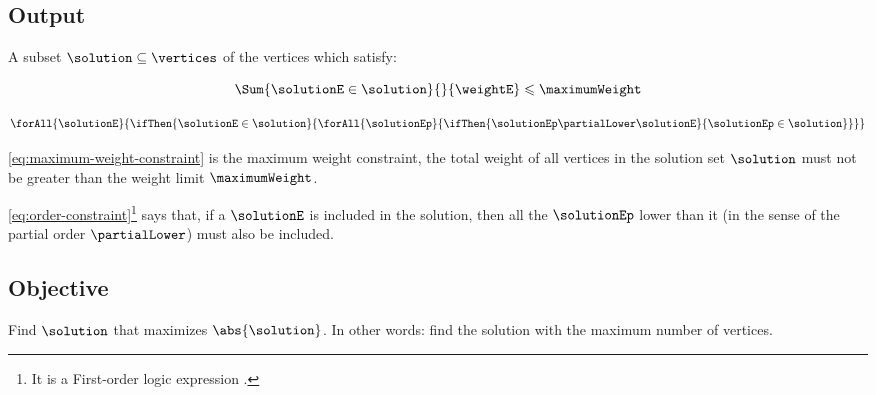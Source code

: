 \subsection{Output}

A subset $\solution \subseteq \vertices$ of the vertices which satisfy:

\begin{equation}
    \label{eq:maximum-weight-constraint}
    \Sum
        {\solutionE \in \solution}
        {}
        {\weightE}
    \leqslant
    \maximumWeight
\end{equation}

\begin{equation}
    \label{eq:order-constraint}
    \forAll
        {\solutionE}
        {\ifThen
            {\solutionE \in \solution}
            {\forAll
                {\solutionEp}
                {\ifThen
                    {\solutionEp \partialLower \solutionE}
                    {\solutionEp \in \solution}
                }
            }
        }
\end{equation}

\eqref{eq:maximum-weight-constraint} is the maximum weight constraint, the total weight of all vertices in the solution set $\solution$ must not be greater than the weight limit $\maximumWeight$.

\eqref{eq:order-constraint}\footnote{It is a First-order logic expression \cite{bib:logic}.} says that, if a $\solutionE$ is included in the solution, then all the $\solutionEp$ lower than it (in the sense of the partial order $\partialLower$) must also be included.

\subsection{Objective}

Find $\solution$ that maximizes $\abs{\solution}$. In other words: find the solution with the maximum number of vertices.
